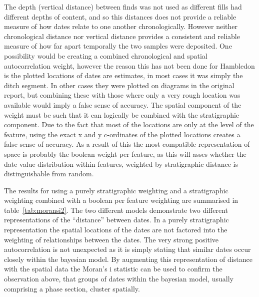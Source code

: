 The depth (vertical distance) between finds was not used as different fills had different depths of content, and so this distances does not provide a reliable measure of how dates relate to one another chronologically. However neither chronological distance nor vertical distance provides a consistent and reliable measure of how far apart temporally the two samples were deposited. One possibility would be creating a combined chronological and spatial autocorrelation weight, however the reason this has not been done for Hambledon is the plotted locations of dates are estimates, in most cases it was simply the ditch segment. In other cases they were plotted on diagrams in the original report, but combining these with those where only a very rough location was available would imply a false sense of accuracy. The spatial component of the weight must be such that it can logically be combined with the stratigraphic component. Due to the fact that most of the locations are only at the level of the feature, using the exact x and y c-ordinates of the plotted locations creates a false sense of accuracy. As a result of this the most compatible representation of space is probably the boolean weight per feature, as this will asses whether the date value distribution within features, weighted by stratigraphic distance is distinguishable from random. 


The results for using a purely stratigraphic weighting and a stratigraphic weighting combined with a boolean per feature weighting are summarised in table~\ref{tab:moransi2}. The two different models demonstrate two different representations of the ``distance'' between dates. In a purely stratigraphic representation the spatial locations of the dates are not factored into the weighting of relationships between the dates. The very strong positive autocorrelation is not unexpected as it is simply stating that similar dates occur closely within the bayesian model. By augmenting this representation of distance with the spatial data the Moran's i statistic can be used to confirm the observation above, that groups of dates within the bayesian model, usually comprising a phase section, cluster spatially. 

